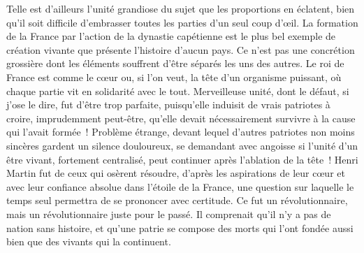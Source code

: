\documentclass[french,twoside]{book} %
\newcommand\orgName[1]{#1}
\newcommand\persName[1]{#1}
\begin{document}
Telle est d’ailleurs l’unité grandiose du sujet que les proportions en éclatent, bien qu’il soit difficile d’embrasser toutes les parties d’un seul coup d’œil. La formation de la {\orgName France} par l’action de la dynastie capétienne est le plus bel exemple de création vivante que présente l’histoire d’aucun pays. Ce n’est pas une concrétion grossière dont les éléments souffrent d’être séparés les uns des autres. Le roi de France est comme le cœur ou, si l’on veut, la tête d’un organisme puissant, où chaque partie vit en solidarité avec le tout. Merveilleuse unité, dont le défaut, si j’ose le dire, fut d’être trop parfaite, puisqu’elle induisit de vrais patriotes à croire, imprudemment peut-être, qu’elle devait nécessairement survivre à la cause qui l’avait formée ! Problème étrange, devant lequel d’autres patriotes non moins sincères gardent un silence douloureux, se demandant avec angoisse si l’unité d’un être vivant, fortement centralisé, peut continuer après l’ablation de la tête ! {\persName Henri Martin} fut de ceux qui osèrent résoudre, d’après les aspirations de leur cœur et avec leur confiance absolue dans l’étoile de la {\orgName France}, une question sur laquelle le temps seul permettra de se prononcer avec certitude. Ce fut un révolutionnaire, mais un révolutionnaire juste pour le passé. Il comprenait qu’il n’y a pas de nation sans histoire, et qu’une patrie se compose des morts qui l’ont fondée aussi bien que des vivants qui la continuent.\par
\end{document}
